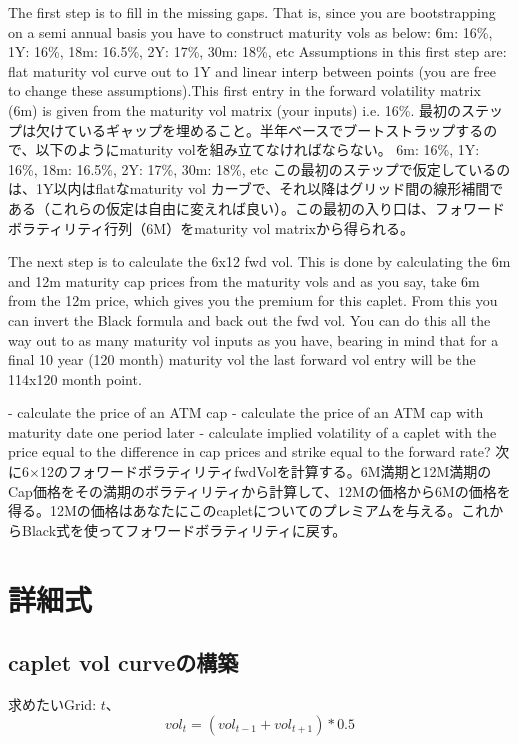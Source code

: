\documentclass[platex]{jsarticle}
\numberwithin{equation}{section}
\begin{document}
The first step is to fill in the missing gaps. That is, since you are bootstrapping on a semi annual basis you have to construct maturity vols as below:
6m: 16\%, 1Y: 16\%, 18m: 16.5\%, 2Y: 17\%, 30m: 18\%, etc
Assumptions in this first step are: flat maturity vol curve out to 1Y and linear interp between points (you are free to change these assumptions).This first entry in the forward volatility matrix (6m) is given from the maturity vol matrix (your inputs) i.e. 16\%.
\fi
最初のステップは欠けているギャップを埋めること。半年ベースでブートストラップするので、以下のようにmaturity volを組み立てなければならない。
6m: 16\%, 1Y: 16\%, 18m: 16.5\%, 2Y: 17\%, 30m: 18\%, etc
この最初のステップで仮定しているのは、1Y以内はflatなmaturity vol カーブで、それ以降はグリッド間の線形補間である（これらの仮定は自由に変えれば良い）。この最初の入り口は、フォワードボラティリティ行列（6M）をmaturity vol matrixから得られる。


The next step is to calculate the 6x12 fwd vol. This is done by calculating the 6m and 12m maturity cap prices from the maturity vols and as you say, take 6m from the 12m price, which gives you the premium for this caplet. From this you can invert the Black formula and back out the fwd vol. You can do this all the way out to as many maturity vol inputs as you have, bearing in mind that for a final 10 year (120 month) maturity vol the last forward vol entry will be the 114x120 month point.
\fi


- calculate the price of an ATM cap
- calculate the price of an ATM cap with maturity date one period later
- calculate implied volatility of a caplet with the price equal to the difference in cap prices and strike equal to the forward rate?
\fi
次に6$\times$12のフォワードボラティリティfwdVolを計算する。6M満期と12M満期のCap価格をその満期のボラティリティから計算して、12Mの価格から6Mの価格を得る。12Mの価格はあなたにこのcapletについてのプレミアムを与える。これからBlack式を使ってフォワードボラティリティに戻す。

\section{詳細式}
\subsection{caplet vol curveの構築}
求めたいGrid: $t$、
\[
vol_t = (vol_{t-1} + vol_{t+1}) * 0.5
\]

\fi
  
  
  
\end{document}
